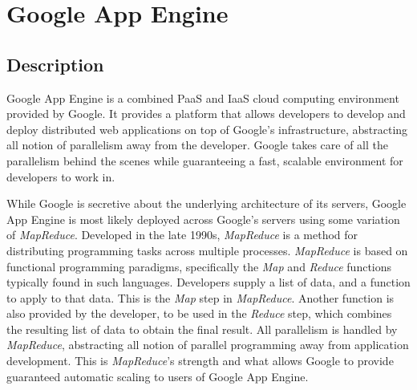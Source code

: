 \newcommand{\gae}[0]{Google App Engine}
\newcommand{\mr}[0]{\emph{MapReduce}}
\chapter{Google App Engine}

\section{Description}
\gae{} is a combined PaaS and IaaS cloud computing environment provided by Google. It provides a platform that allows developers to develop and deploy distributed web applications on top of Google's infrastructure, abstracting all notion of parallelism away from the developer. Google takes care of all the parallelism behind the scenes while guaranteeing a fast, scalable environment for developers to work in\ftGAEOne.\ftGAEOneText

While Google is secretive about the underlying architecture of its servers, \gae{} is most likely deployed across Google's servers using some variation of \mr{}. Developed in the late 1990s, \mr{} is a method for distributing programming tasks across multiple processes. \mr{} is based on functional programming paradigms, specifically the \emph{Map} and \emph{Reduce} functions typically found in such languages. Developers supply a list of data, and a function to apply to that data. This is the \emph{Map} step in \mr{}. Another function is also provided by the developer, to be used in the \emph{Reduce} step, which combines the resulting list of data to obtain the final result. All parallelism is handled by \mr{}, abstracting all notion of parallel programming away from application development. This is \mr{}'s strength and what allows Google to provide guaranteed automatic scaling to users of \gae{}.~\cite{MapReduce}

%

